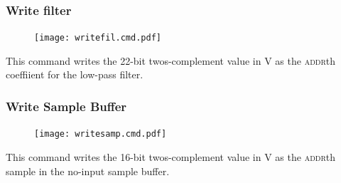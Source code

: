\subsubsection{Write filter}
\begin{figure}[h!]
\texttt{[image: writefil.cmd.pdf]}
\end{figure}

This command writes the 22-bit twos-complement value in V as the \textsc{addr}th coeffiient for the low-pass filter. 

\subsubsection{Write Sample Buffer}
\begin{figure}[h!]
\texttt{[image: writesamp.cmd.pdf]}
\end{figure}

This command writes the 16-bit twos-complement value in V as the \textsc{addr}th sample in the no-input sample buffer. 




